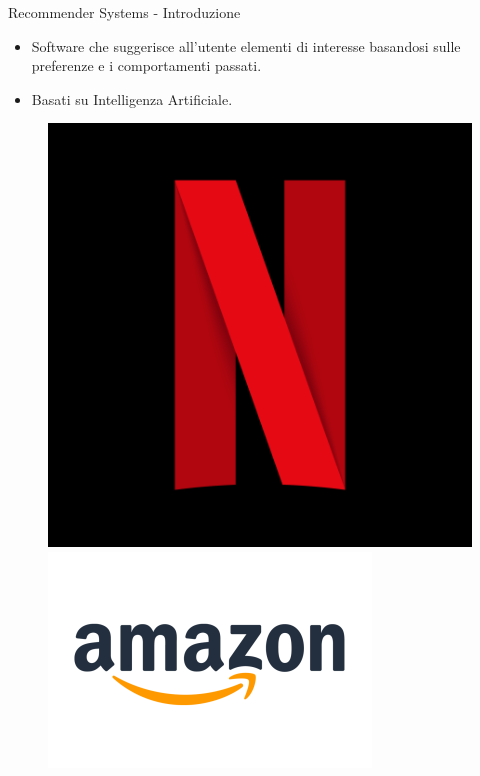 \begin{frame}{Recommender Systems - Introduzione}
\begin{itemize}
\item Software che suggerisce all'utente elementi di interesse basandosi sulle preferenze e i comportamenti passati.
    \item Basati su Intelligenza Artificiale.
\end{itemize}
\begin{figure}[h!]
    \centering
    \begin{minipage}{0.15\textwidth}
        \centering
        \includegraphics[width=\textwidth]{images/netflix.png}
    \end{minipage}\hfill
    \begin{minipage}{0.15\textwidth}
        \centering
        \includegraphics[width=\textwidth]{images/amazon.png}

\end{minipage}
\end{figure}
\end{frame}
